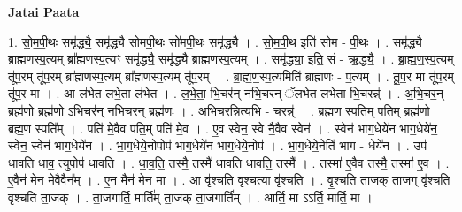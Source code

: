 \documentclass[17pt]{extarticle}
\begin{document}
\textbf{Jatai Paata} \newline

1. सो॒म॒पी॒थः समृ॑द्ध्यै॒ समृ॑द्ध्यै सोमपी॒थः सो॑मपी॒थः समृ॑द्ध्यै । . सो॒म॒पी॒थ इति॑ सोम - पी॒थः । . समृ॑द्ध्यै ब्राह्मणस्प॒त्यम् ब्रा᳚ह्मणस्प॒त्यꣳ समृ॑द्ध्यै॒ समृ॑द्ध्यै ब्राह्मणस्प॒त्यम् । . समृ॑द्ध्या॒ इति॒ सं - ऋ॒द्ध्यै॒ । . ब्रा॒ह्म॒ण॒स्प॒त्यम् तू॑प॒रम् तू॑प॒रम् ब्रा᳚ह्मणस्प॒त्यम् ब्रा᳚ह्मणस्प॒त्यम् तू॑प॒रम् । . ब्रा॒ह्म॒ण॒स्प॒त्यमिति॑ ब्राह्मणः - प॒त्यम् । . तू॒प॒र मा तू॑प॒रम् तू॑प॒र मा । . आ ल॑भेत लभे॒ता ल॑भेत । . ल॒भे॒ता॒ भि॒चर॑न् नभि॒चर॑न् ॅलभेत लभेता भि॒चरन्न्॑ । . अ॒भि॒चर॒न् ब्रह्म॑णो॒ ब्रह्म॑णो ऽभि॒चर॑न् नभि॒चर॒न् ब्रह्म॑णः । . अ॒भि॒चर॒न्नित्य॑भि - चरन्न्॑ । . ब्रह्म॒ण स्पति॒म् पति॒म् ब्रह्म॑णो॒ ब्रह्म॒ण स्पति᳚म् । . पति॑ मे॒वैव पति॒म् पति॑ मे॒व । . ए॒व स्वेन॒ स्वे नै॒वैव स्वेन॑ । . स्वेन॑ भाग॒धेये॑न भाग॒धेये॑न॒ स्वेन॒ स्वेन॑ भाग॒धेये॑न । . भा॒ग॒धेये॒नोपोप॑ भाग॒धेये॑न भाग॒धेये॒नोप॑ । . भा॒ग॒धेये॒नेति॑ भाग - धेये॑न । . उप॑ धावति धाव॒ त्युपोप॑ धावति । . धा॒व॒ति॒ तस्मै॒ तस्मै॑ धावति धावति॒ तस्मै᳚ । . तस्मा॑ ए॒वैव तस्मै॒ तस्मा॑ ए॒व । . ए॒वैन॑ मेन मे॒वैवैन᳚म् । . ए॒न॒ मैन॑ मेन॒ मा । . आ वृ॑श्चति वृश्च॒त्या वृ॑श्चति । . वृ॒श्च॒ति॒ ता॒जक् ता॒जग् वृ॑श्चति वृश्चति ता॒जक् । . ता॒जगार्ति॒ मार्ति॑म् ता॒जक् ता॒जगार्ति᳚म् । . आर्ति॒ मा ऽऽर्ति॒ मार्ति॒ मा । \newline
\end{document}
